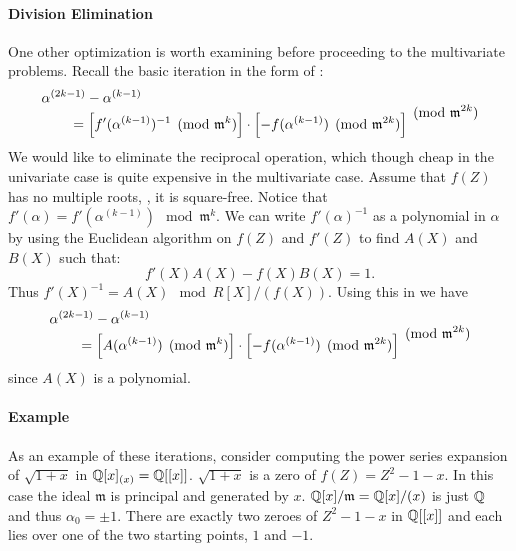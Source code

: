 {\paragraph{Division Elimination}

One other optimization is worth examining before proceeding to the
multivariate problems.  Recall the basic iteration in the form of
:
\[
\begin{aligned}
\null & \alpha^{(2k-1)} - \alpha^{(k-1)} \\
\null & \qquad = 
\left[ f'(\alpha^{(k-1)})^{-1} \pmod{\mathfrak{m}^k}\right]
\cdot
\left[ - f(\alpha^{(k-1)}) \pmod{\mathfrak{m}^{2k}}\right]
\end{aligned}
\pmod{\mathfrak{m}^{2k}}
\]
We would like to eliminate the reciprocal operation, which though cheap in
the univariate case is quite expensive in the multivariate case.  Assume
that $f(Z)$ has no multiple roots, \ie, it is square-free.  Notice that
$f'(\alpha) = f'(\alpha^{(k-1)}) \mod{\mathfrak{m}^k}$.  We can write
$f'(\alpha)^{-1}$ as a polynomial in $\alpha$ by using the Euclidean
algorithm on $f(Z)$ and $f'(Z)$ to find $A(X)$ and $B(X)$ such that:
\[
f'(X) A(X) - f(X) B(X) = 1.
\]
Thus $f'(X)^{-1} = A(X) \mod{R[X]/(f(X))}$.  Using this in
 we have
\[
\begin{aligned}
\null & \alpha^{(2k-1)} - \alpha^{(k-1)} \\
\null & \qquad=  
\left[ A(\alpha^{(k-1)}) \pmod{\mathfrak{m}^k}\right] \cdot
\left[ - f(\alpha^{(k-1)}) \pmod{\mathfrak{m}^{2k}}\right] 
\end{aligned} 
\pmod{\mathfrak{m}^{2k}}
\]
since $A(X)$ is a polynomial.

\paragraph{Example}

As an example of these iterations, consider computing the power series
expansion of $\sqrt{1+x}$ in $\mathbb{Q}[x]_{(x)} = \mathbb{Q}[[x]]$.  $\sqrt{1+x}$ is
a zero of $f(Z) = Z^2 - 1 - x$.  In this case the ideal $\mathfrak{m}$
is principal and generated by $x$.  $\mathbb{Q}[x]/\mathfrak{m} = \mathbb{Q}[x]/(x)$
is just $\mathbb{Q}$ and thus $\alpha_0 = \pm1$.  There are exactly two zeroes
of $Z^2 -1 - x$ in $\mathbb{Q}[[x]]$ and each lies over one of the two
starting points, $1$ and $-1$.

}
